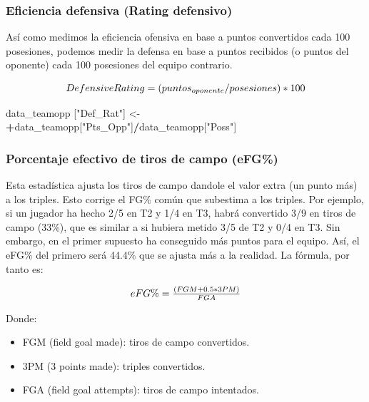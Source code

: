 \documentclass[
]{article}
\newenvironment{Shaded}{\begin{snugshade}}{\end{snugshade}}
\newcommand{\NormalTok}[1]{#1}
\newcommand{\OperatorTok}[1]{\textcolor[rgb]{0.81,0.36,0.00}{\textbf{#1}}}
\newcommand{\StringTok}[1]{\textcolor[rgb]{0.31,0.60,0.02}{#1}}
\providecommand{\tightlist}{%
  \setlength{\itemsep}{0pt}\setlength{\parskip}{0pt}}
\begin{document}
\newpage

\hypertarget{eficiencia-defensiva-rating-defensivo}{%
\subsubsection{Eficiencia defensiva (Rating
defensivo)}\label{eficiencia-defensiva-rating-defensivo}}

Así como medimos la eficiencia ofensiva en base a puntos convertidos
cada 100 posesiones, podemos medir la defensa en base a puntos recibidos
(o puntos del oponente) cada 100 posesiones del equipo contrario.

\[
  \makebox[\linewidth]{$Defensive Rating = (puntos_{oponente}/posesiones)*100$}
\]

\begin{Shaded}
\begin{Highlighting}[]
\NormalTok{data_teamopp [}\StringTok{"Def_Rat"}\NormalTok{] <-}\StringTok{ }\OperatorTok{+}\NormalTok{data_teamopp[}\StringTok{"Pts_Opp"}\NormalTok{]}\OperatorTok{/}\NormalTok{data_teamopp[}\StringTok{"Poss"}\NormalTok{]}
\end{Highlighting}
\end{Shaded}

\hypertarget{porcentaje-efectivo-de-tiros-de-campo-efg}{%
\subsubsection{Porcentaje efectivo de tiros de campo
(eFG\%)}\label{porcentaje-efectivo-de-tiros-de-campo-efg}}

Esta estadística ajusta los tiros de campo dandole el valor extra (un
punto más) a los triples. Esto corrige el FG\% común que subestima a los
triples. Por ejemplo, si un jugador ha hecho 2/5 en T2 y 1/4 en T3,
habrá convertido 3/9 en tiros de campo (33\%), que es similar a si
hubiera metido 3/5 de T2 y 0/4 en T3. Sin embargo, en el primer supuesto
ha conseguido más puntos para el equipo. Así, el eFG\% del primero será
44.4\% que se ajusta más a la realidad. La fórmula, por tanto es:

\[
  \makebox[\linewidth]{$eFG\% = \frac{(FGM + 0.5*3PM)}{FGA}$}
\]

Donde:

\begin{itemize}
\tightlist
\item
  FGM (field goal made): tiros de campo convertidos.
\item
  3PM (3 points made): triples convertidos.
\item
  FGA (field goal attempts): tiros de campo intentados.
\end{itemize}
\end{document}

